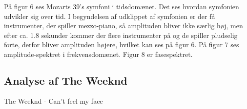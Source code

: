 \documentclass[12pt, letterpaper]{article}
\begin{document}
\begin{figure}[!h]
           \begin{floatrow}
       
           \end{floatrow}
\end{figure}

På figur 6 ses Mozarts 39's symfoni i tidsdomænet. Det ses hvordan symfonien udvikler sig over tid. I begyndelsen af udklippet af symfonien er der få instrumenter, der spiller mezzo-piano, så amplituden bliver ikke særlig høj, men efter ca. 1.8 sekunder kommer der flere instrumenter på og de spiller pludselig forte, derfor bliver amplituden højere, hvilket kan ses på figur 6. 
På figur 7 ses amplitude-spektret i frekvensdomænet. 
Figur 8 er fasespektret. 

\newpage

\subsection{Analyse af The Weeknd}
The Weeknd - Can't feel my face
\end{document}
